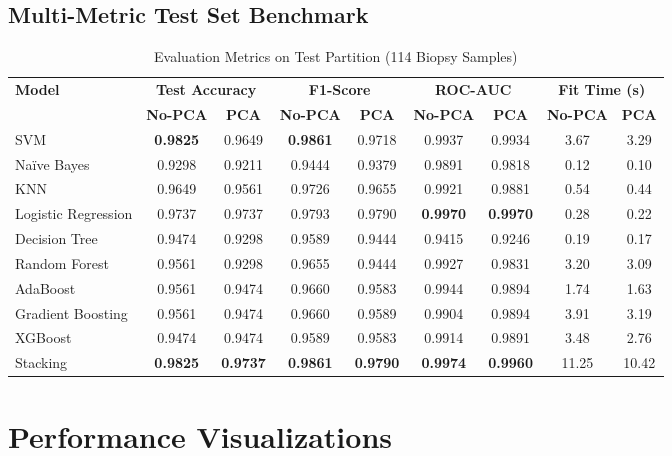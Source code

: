 \documentclass[12pt,a4paper]{article}
\begin{document}
\subsection{Multi-Metric Test Set Benchmark}
\begin{table}[H]
\centering
\caption{Evaluation Metrics on Test Partition (114 Biopsy Samples)}
\label{tab:test_metrics}
\small
\begin{tabular}{|l|c|c|c|c|c|c|c|c|}
\hline
\textbf{Model} & \multicolumn{2}{c|}{\textbf{Test Accuracy}} & \multicolumn{2}{c|}{\textbf{F1-Score}} & \multicolumn{2}{c|}{\textbf{ROC-AUC}} & \multicolumn{2}{c|}{\textbf{Fit Time (s)}}\\ \cline{2-9}
& \textbf{No-PCA} & \textbf{PCA} & \textbf{No-PCA} & \textbf{PCA} & \textbf{No-PCA} & \textbf{PCA} & \textbf{No-PCA} & \textbf{PCA}\\ \hline
SVM & \textbf{0.9825} & 0.9649 & \textbf{0.9861} & 0.9718 & 0.9937 & 0.9934 & 3.67 & 3.29\\ \hline
Na\"ive Bayes & 0.9298 & 0.9211 & 0.9444 & 0.9379 & 0.9891 & 0.9818 & 0.12 & 0.10\\ \hline
KNN & 0.9649 & 0.9561 & 0.9726 & 0.9655 & 0.9921 & 0.9881 & 0.54 & 0.44\\ \hline
Logistic Regression & 0.9737 & 0.9737 & 0.9793 & 0.9790 & \textbf{0.9970} & \textbf{0.9970} & 0.28 & 0.22\\ \hline
Decision Tree & 0.9474 & 0.9298 & 0.9589 & 0.9444 & 0.9415 & 0.9246 & 0.19 & 0.17\\ \hline
Random Forest & 0.9561 & 0.9298 & 0.9655 & 0.9444 & 0.9927 & 0.9831 & 3.20 & 3.09\\ \hline
AdaBoost & 0.9561 & 0.9474 & 0.9660 & 0.9583 & 0.9944 & 0.9894 & 1.74 & 1.63\\ \hline
Gradient Boosting & 0.9561 & 0.9474 & 0.9660 & 0.9589 & 0.9904 & 0.9894 & 3.91 & 3.19\\ \hline
XGBoost & 0.9474 & 0.9474 & 0.9589 & 0.9583 & 0.9914 & 0.9891 & 3.48 & 2.76\\ \hline
Stacking & \textbf{0.9825} & \textbf{0.9737} & \textbf{0.9861} & \textbf{0.9790} & \textbf{0.9974} & \textbf{0.9960} & 11.25 & 10.42\\ \hline
\end{tabular}
\end{table}

\section{Performance Visualizations}
\end{document}

